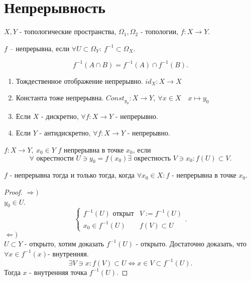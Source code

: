 \documentclass[12pt]{report}
\begin{document}
\section{Непрерывность}
$X, Y$ - топологические пространства, $\Omega_1, \Omega_2$ -  топологии, $f: X \to  Y$.
\begin{defn}
    $f$ -- непрерывна, если $\forall U \subset \Omega _Y: ~ f^{-1} \subset \Omega_X$.
\end{defn}
\begin{note}
    \[
	f^{-1} (A \cap B) = f^{-1}(A) \cap f^{-1}(B)
    .\] 
\end{note}
\begin{exs}
    \begin{enumerate}
	\item Тождественное отображение непрерывно. $id_X : X \to  X$
	\item Константа тоже непрерывна. $Const_{y_0}:X \to Y, ~ \forall x \in  X \quad x\mapsto y_0 $
	\item Если $X$ - дискретно, $\forall f: X \to  Y$ - непрерывно.
	\item Если $Y$ - антидискретно, $\forall f: X \to  Y$ - непрерывно.
    \end{enumerate}
\end{exs}
\begin{defn}
    $f: X \to  Y, ~ x_0 \in Y$
    $f$ непрерывна в точке $ x_0$, если \[
	\forall \mbox{ окрестности } U \ni y_0 = f(x_0) \exists \mbox{ окрестность } V \ni x_0: f(U) \subset V
    .\] 
\end{defn}
\begin{thm}
    $f$ - непрерывна тогда и только тогда, когда $\forall x_0 \in  X: f$ - непрерывна в точке $x_0$.
\end{thm}
\begin{proof}
    $\Rightarrow )$\\
	$y_0 \in  U$.
	\[
	\left \{ 
	    \begin{array}{ll}
		f^{-1}(U) \mbox{ открыт} & V:=f^{-1}(U)\\
		x_0 \in f^{-1}(U) & f(V) \subset U
	        
	    \end{array}
	    \right .
	.\] 
	$\Leftarrow )$\\
	$U \subset Y$ - открыто, хотим доказать $f^{-1}(U)$ - открыто.
	Достаточно доказать, что $\forall x \in  f^{-1}(x) $- внутренняя.
	\[
	    \exists V \ni x: f(V)\subset U \Leftrightarrow x \in  V \subset f^{-1}(U)
	.\] 
	Тогда $x$ - внутренняя точка $f^{-1}(U)$.
\end{proof}
\end{document}
